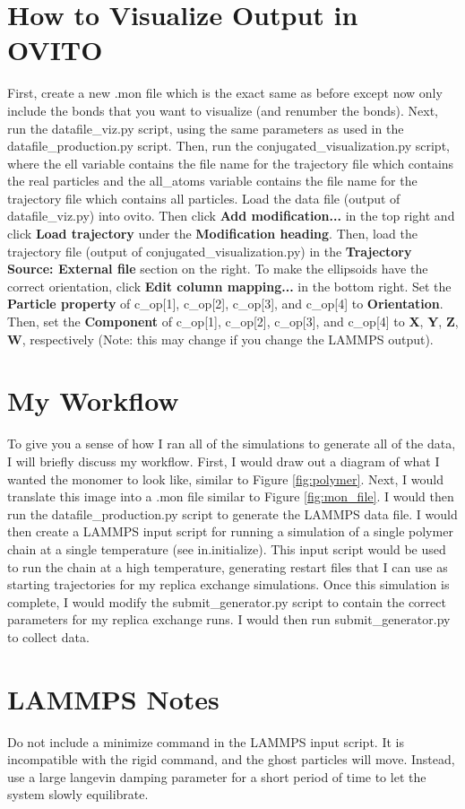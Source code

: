 \documentclass{article}
\begin{document}
\section{How to Visualize Output in OVITO}
First, create a new .mon file which is the exact same as before except now only include the bonds that you want to visualize (and renumber the bonds). Next, run the datafile\_viz.py script, using the same parameters as used in the datafile\_production.py script. Then, run the conjugated\_visualization.py script, where the ell variable contains the file name for the trajectory file which contains the real particles and the all\_atoms variable contains the file name for the trajectory file which contains all particles. Load the data file (output of datafile\_viz.py) into ovito. Then click \textbf{Add modification...} in the top right and click \textbf{Load trajectory} under the \textbf{Modification heading}. Then, load the trajectory file (output of conjugated\_visualization.py) in the \textbf{Trajectory Source: External file} section on the right. To make the ellipsoids have the correct orientation, click \textbf{Edit column mapping...} in the bottom right. Set the \textbf{Particle property} of c\_op[1], c\_op[2], c\_op[3], and c\_op[4] to \textbf{Orientation}. Then, set the \textbf{Component} of c\_op[1], c\_op[2], c\_op[3], and c\_op[4] to \textbf{X}, \textbf{Y}, \textbf{Z}, \textbf{W}, respectively (Note: this may change if you change the LAMMPS output). 

\section{My Workflow}
To give you a sense of how I ran all of the simulations to generate all of the data, I will briefly discuss my workflow. First, I would draw out a diagram of what I wanted the monomer to look like, similar to Figure \ref{fig:polymer}. Next, I would translate this image into a .mon file similar to Figure \ref{fig:mon_file}. I would then run the datafile\_production.py script to generate the LAMMPS data file. I would then create a LAMMPS input script for running a simulation of a single polymer chain at a single temperature (see in.initialize). This input script would be used to run the chain at a high temperature, generating restart files that I can use as starting trajectories for my replica exchange simulations. Once this simulation is complete, I would modify the submit\_generator.py script to contain the correct parameters for my replica exchange runs. I would then run submit\_generator.py to collect data. 

\section{LAMMPS Notes}
Do not include a minimize command in the LAMMPS input script. It is incompatible with the rigid command, and the ghost particles will move. Instead, use a large langevin damping parameter for a short period of time to let the system slowly equilibrate. 
\end{document}
